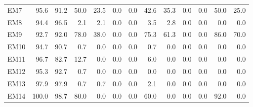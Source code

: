 \begin{tabular}{lrrrrrrrrrrrr}
EM7 & 95.6 & 91.2 & 50.0 & 23.5 & 0.0 & 0.0 & 42.6 & 35.3 & 0.0 & 0.0 & 50.0 & 25.0 \\
EM8 & 94.4 & 96.5 & 2.1 & 2.1 & 0.0 & 0.0 & 3.5 & 2.8 & 0.0 & 0.0 & 0.0 & 0.0 \\
EM9 & 92.7 & 92.0 & 78.0 & 38.0 & 0.0 & 0.0 & 75.3 & 61.3 & 0.0 & 0.0 & 86.0 & 70.0 \\
EM10 & 94.7 & 90.7 & 0.7 & 0.0 & 0.0 & 0.0 & 0.7 & 0.0 & 0.0 & 0.0 & 0.0 & 0.0 \\
EM11 & 96.7 & 82.7 & 12.7 & 0.0 & 0.0 & 0.0 & 6.0 & 0.0 & 0.0 & 0.0 & 0.0 & 0.0 \\
EM12 & 95.3 & 92.7 & 0.7 & 0.0 & 0.0 & 0.0 & 0.0 & 0.0 & 0.0 & 0.0 & 0.0 & 0.0 \\
EM13 & 97.9 & 97.9 & 0.7 & 0.7 & 0.0 & 0.0 & 2.1 & 0.0 & 0.0 & 0.0 & 0.0 & 0.0 \\
EM14 & 100.0 & 98.7 & 80.0 & 0.0 & 0.0 & 0.0 & 60.0 & 0.0 & 0.0 & 0.0 & 92.0 & 0.0 \\
\bottomrule
\end{tabular}
